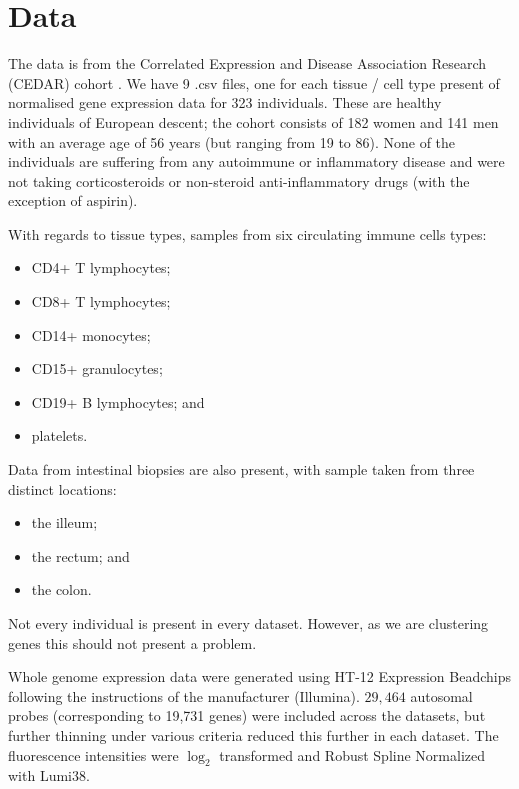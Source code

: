 \documentclass[12pt]{article} %
\begin{document}
	

	

	\section{Data}	
	The data is from the Correlated Expression and Disease Association Research (CEDAR) cohort \cite{TheInternationalIBDGeneticsConsortiumIBDriskloci2018}. We have 9 .csv files, one for each tissue / cell type present of normalised gene expression data for 323 individuals. These are healthy individuals of European descent; the cohort consists of 182 women and 141 men with an average age of 56 years (but ranging from 19 to 86). None of the individuals are suffering from any autoimmune or inflammatory disease and were not taking corticosteroids or non-steroid anti-inflammatory drugs (with the exception of aspirin). 
	
	With regards to tissue types, samples from six circulating immune cells types:
	\begin{itemize}
		\item CD4+ T lymphocytes;
		\item CD8+ T lymphocytes;
		\item CD14+ monocytes;
		\item CD15+ granulocytes;
		\item CD19+ B lymphocytes; and 
		\item platelets.
	\end{itemize}
	Data from intestinal biopsies are also present, with sample taken from three distinct locations:
	\begin{itemize}
		\item the illeum;
		\item the rectum; and
		\item the colon.
	\end{itemize} 
	Not every individual is present in every dataset. However, as we are clustering genes this should not present a problem.
	
	Whole genome expression data were generated using HT-12 Expression Beadchips following the instructions of the manufacturer (Illumina). $29,464$ autosomal probes (corresponding to 19,731 genes) were included across the datasets, but further thinning under various criteria reduced this further in each dataset. The fluorescence intensities were $\log_2$ transformed and Robust Spline Normalized with Lumi38.
	
\end{document}
